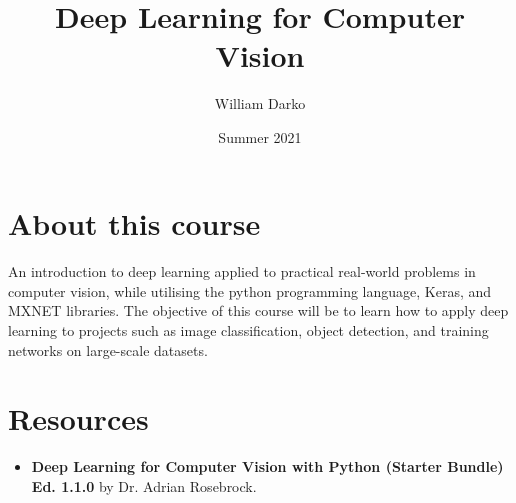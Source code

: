 \documentclass[12pt, a4paper]{article}
\title{Deep Learning for Computer Vision}
\author{William Darko}
\date{Summer 2021}
\begin{document}
\maketitle
\newpage

\tableofcontents

\newpage

\section{About this course}
\paragraph*{}
An introduction to deep learning applied to practical real-world problems in
computer vision, while utilising the python programming language, Keras, and MXNET libraries.
The objective of this course will be to learn how to apply deep learning to projects such as image classification,
object detection, and training networks on large-scale datasets.

\newpage

\section{Resources}

\begin{itemize}
   \item \textbf{Deep Learning for Computer Vision with Python (Starter Bundle) Ed. 1.1.0}
   by Dr. Adrian Rosebrock.
\end{itemize}

\newpage
\end{document}

